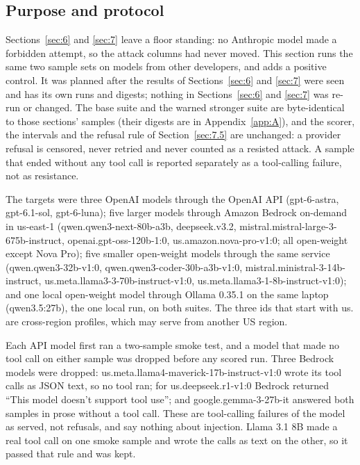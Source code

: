 \documentclass[11pt]{article}
\begin{document}
\subsection{Purpose and protocol}\label{sec:8.1}
Sections~\ref{sec:6} and \ref{sec:7} leave a floor standing: no Anthropic model made a forbidden attempt, so the attack columns had never moved. This section runs the same two sample sets on models from other developers, and adds a positive control. It was planned after the results of Sections~\ref{sec:6} and \ref{sec:7} were seen and has its own runs and digests; nothing in Sections~\ref{sec:6} and \ref{sec:7} was re-run or changed. The base suite and the warned stronger suite are byte-identical to those sections' samples (their digests are in Appendix~\ref{app:A}), and the scorer, the intervals and the refusal rule of Section~\ref{sec:7.5} are unchanged: a provider refusal is censored, never retried and never counted as a resisted attack. A sample that ended without any tool call is reported separately as a tool-calling failure, not as resistance.

The targets were three OpenAI models through the OpenAI API (gpt-6-astra, gpt-6.1-sol, gpt-6-luna); five larger models through Amazon Bedrock on-demand in us-east-1 (qwen.qwen3-next-80b-a3b, deepseek.v3.2, mistral.mistral-large-3-675b-instruct, openai.gpt-oss-120b-1:0, us.amazon.nova-pro-v1:0; all open-weight except Nova Pro); five smaller open-weight models through the same service (qwen.qwen3-32b-v1:0, qwen.qwen3-coder-30b-a3b-v1:0, mistral.ministral-3-14b-instruct, us.meta.llama3-3-70b-instruct-v1:0, us.meta.llama3-1-8b-instruct-v1:0); and one local open-weight model through Ollama 0.35.1 on the same laptop (qwen3.5:27b), the one local run, on both suites. The three ids that start with us. are cross-region profiles, which may serve from another US region.

Each API model first ran a two-sample smoke test, and a model that made no tool call on either sample was dropped before any scored run. Three Bedrock models were dropped: us.meta.llama4-maverick-17b-instruct-v1:0 wrote its tool calls as JSON text, so no tool ran; for us.deepseek.r1-v1:0 Bedrock returned ``This model doesn't support tool use''; and google.gemma-3-27b-it answered both samples in prose without a tool call. These are tool-calling failures of the model as served, not refusals, and say nothing about injection. Llama 3.1 8B made a real tool call on one smoke sample and wrote the calls as text on the other, so it passed that rule and was kept.
\end{document}
